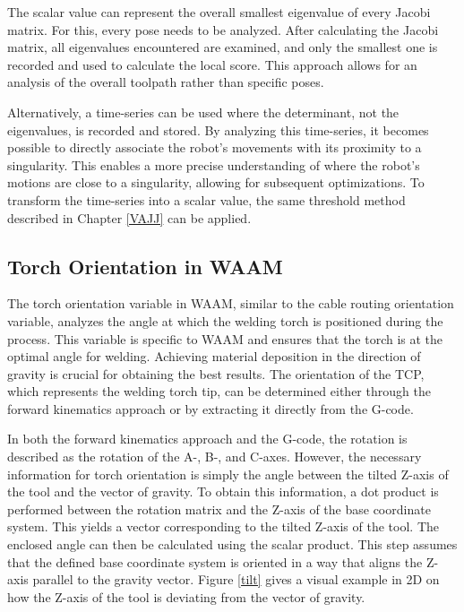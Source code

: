 \documentclass[conference]{IEEEtran}
\begin{document}
The scalar value can represent the overall smallest eigenvalue of every Jacobi matrix. For this, every pose needs to be analyzed. After calculating the Jacobi matrix, all eigenvalues encountered are examined, and only the smallest one is recorded and used to calculate the local score. This approach allows for an analysis of the overall toolpath rather than specific poses.

Alternatively, a time-series can be used where the determinant, not the eigenvalues, is recorded and stored. By analyzing this time-series, it becomes possible to directly associate the robot's movements with its proximity to a singularity. This enables a more precise understanding of where the robot's motions are close to a singularity, allowing for subsequent optimizations. To transform the time-series into a scalar value, the same threshold method described in Chapter \ref{VAJJ} can be applied.


\subsection{Torch Orientation in WAAM}
The torch orientation variable in WAAM, similar to the cable routing orientation variable, analyzes the angle at which the welding torch is positioned during the process. This variable is specific to WAAM and ensures that the torch is at the optimal angle for welding. Achieving material deposition in the direction of gravity is crucial for obtaining the best results. The orientation of the TCP, which represents the welding torch tip, can be determined either through the forward kinematics approach or by extracting it directly from the G-code.

In both the forward kinematics approach and the G-code, the rotation is described as the rotation of the A-, B-, and C-axes. However, the necessary information for torch orientation is simply the angle between the tilted Z-axis of the tool and the vector of gravity. To obtain this information, a dot product is performed between the rotation matrix and the Z-axis of the base coordinate system. This yields a vector corresponding to the tilted Z-axis of the tool. The enclosed angle can then be calculated using the scalar product. This step assumes that the defined base coordinate system is oriented in a way that aligns the Z-axis parallel to the gravity vector. Figure \ref{tilt} gives a visual example in 2D on how the Z-axis of the tool is deviating from the vector of gravity.
\end{document}
